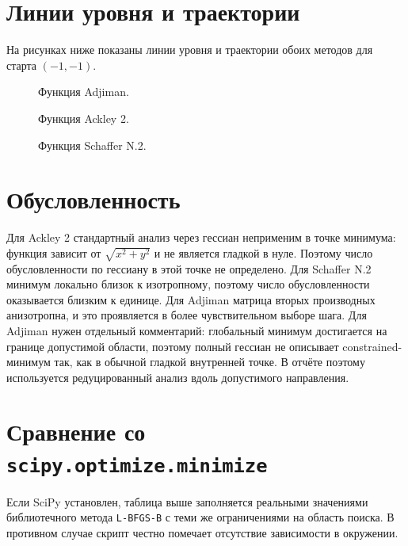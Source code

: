 \documentclass[12pt,a4paper]{article}
\begin{document}
\section{Линии уровня и траектории}
На рисунках ниже показаны линии уровня и траектории обоих методов для старта $(-1, -1)$.

\begin{figure}[H]
\centering

\caption{Функция Adjiman.}
\end{figure}

\begin{figure}[H]
\centering

\caption{Функция Ackley 2.}
\end{figure}

\begin{figure}[H]
\centering

\caption{Функция Schaffer N.2.}
\end{figure}

\section{Обусловленность}


Для Ackley 2 стандартный анализ через гессиан неприменим в точке минимума: функция зависит от $\sqrt{x^2+y^2}$ и не является гладкой в нуле. Поэтому число обусловленности по гессиану в этой точке не определено. Для Schaffer N.2 минимум локально близок к изотропному, поэтому число обусловленности оказывается близким к единице. Для Adjiman матрица вторых производных анизотропна, и это проявляется в более чувствительном выборе шага.
Для Adjiman нужен отдельный комментарий: глобальный минимум достигается на границе допустимой области, поэтому полный гессиан не описывает constrained-минимум так, как в обычной гладкой внутренней точке. В отчёте поэтому используется редуцированный анализ вдоль допустимого направления.

\section{Сравнение со \texttt{scipy.optimize.minimize}}


Если SciPy установлен, таблица выше заполняется реальными значениями библиотечного метода \texttt{L-BFGS-B} с теми же ограничениями на область поиска. В противном случае скрипт честно помечает отсутствие зависимости в окружении.
\end{document}

